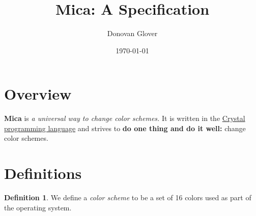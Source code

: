 \documentclass{article}
\title{Mica: A Specification}
\author{Donovan Glover}
\date{\today}
\theoremstyle{definition}
\newtheorem{definition}{Definition}
\begin{document}

	\maketitle
    \tableofcontents

    \newpage


    \section{Overview}

    \textbf{Mica} is \emph{a universal way to change color schemes.} It is written in the \href{https://crystal-lang.org}{Crystal programming language} and strives to \textbf{do one thing and do it well:} change color schemes.

    \newpage


    \section{Definitions}

    \begin{definition}
        We define a \emph{color scheme} to be a set of 16 colors used as part of the operating system.
    \end{definition}
\end{document}
